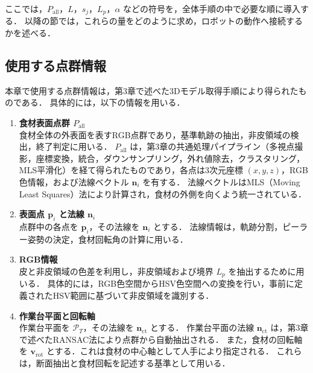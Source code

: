 
ここでは，$P_{\mathrm{all}}$，$L$，$s_j$，$L_p$，$\alpha$ などの符号を，全体手順の中で必要な順に導入する．
以降の節では，これらの量をどのように求め，ロボットの動作へ接続するかを述べる．

\subsection{使用する点群情報}

本章で使用する点群情報は，第3章で述べた3Dモデル取得手順により得られたものである．
具体的には，以下の情報を用いる．

\begin{enumerate}
  \item \textbf{食材表面点群 $P_{\mathrm{all}}$} \\
  食材全体の外表面を表すRGB点群であり，基準軌跡の抽出，非皮領域の検出，終了判定に用いる．
  $P_{\mathrm{all}}$ は，第3章の共通処理パイプライン（多視点撮影，座標変換，統合，ダウンサンプリング，外れ値除去，クラスタリング，MLS平滑化）を経て得られたものであり，各点は3次元座標 $(x, y, z)$，RGB色情報，および法線ベクトル $\mathbf{n}_i$ を有する．
  法線ベクトルはMLS（Moving Least Squares）法\cite{PCL-MLS}により計算され，食材の外側を向くよう統一されている．

  \item \textbf{表面点 $\mathbf{p}_i$ と法線 $\mathbf{n}_i$} \\
  点群中の各点を $\mathbf{p}_i$，その法線を $\mathbf{n}_i$ とする．
  法線情報は，軌跡分割，ピーラー姿勢の決定，食材回転角の計算に用いる．

  \item \textbf{RGB情報} \\
  皮と非皮領域の色差を利用し，非皮領域および境界 $L_p$ を抽出するために用いる．
  具体的には，RGB色空間からHSV色空間への変換を行い，事前に定義されたHSV範囲に基づいて非皮領域を識別する．

  \item \textbf{作業台平面と回転軸} \\
  作業台平面を $\mathcal{P}_T$，その法線を $\mathbf{n}_{\mathrm{ct}}$ とする．
  作業台平面の法線 $\mathbf{n}_{\mathrm{ct}}$ は，第3章で述べたRANSAC法\cite{PCL-RANSAC}により点群から自動抽出される．
  また，食材の回転軸を $\mathbf{v}_{\mathrm{rot}}$ とする．これは食材の中心軸として人手により指定される．
  これらは，断面抽出と食材回転を記述する基準として用いる．
\end{enumerate}

